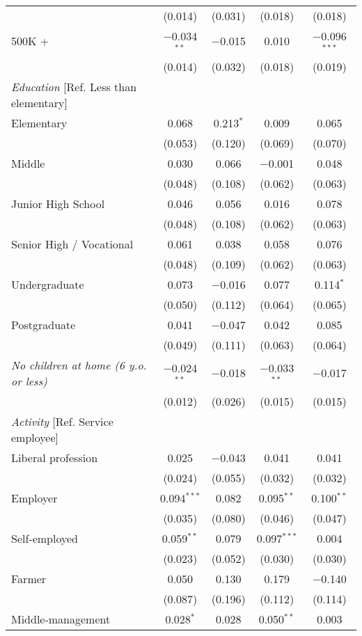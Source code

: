 \documentclass[12pt,a4paper]{article}
\begin{document}
\begin{scriptsize}
\begin{longtable}{@{\extracolsep{5pt}}lcccc}
  & (0.014) & (0.031) & (0.018) & (0.018) \\ 
500K +  & $-$0.034$^{**}$ & $-$0.015 & 0.010 & $-$0.096$^{***}$ \\ 
  & (0.014) & (0.032) & (0.018) & (0.019) \\ 
{\it Education} [Ref. Less than elementary]\\
Elementary & 0.068 & 0.213$^{*}$ & 0.009 & 0.065 \\ 
  & (0.053) & (0.120) & (0.069) & (0.070) \\ 
Middle & 0.030 & 0.066 & $-$0.001 & 0.048 \\ 
  & (0.048) & (0.108) & (0.062) & (0.063) \\ 
Junior High School & 0.046 & 0.056 & 0.016 & 0.078 \\ 
  & (0.048) & (0.108) & (0.062) & (0.063) \\ 
Senior High / Vocational & 0.061 & 0.038 & 0.058 & 0.076 \\ 
  & (0.048) & (0.109) & (0.062) & (0.063) \\ 
Undergraduate & 0.073 & $-$0.016 & 0.077 & 0.114$^{*}$ \\ 
  & (0.050) & (0.112) & (0.064) & (0.065) \\ 
Postgraduate & 0.041 & $-$0.047 & 0.042 & 0.085 \\ 
  & (0.049) & (0.111) & (0.063) & (0.064) \\ 
{\it No children at home (6 y.o. or less)} & $-$0.024$^{**}$ & $-$0.018 & $-$0.033$^{**}$ & $-$0.017 \\ 
  & (0.012) & (0.026) & (0.015) & (0.015) \\ 
{\it Activity} [Ref. Service employee]\\
Liberal profession & 0.025 & $-$0.043 & 0.041 & 0.041 \\ 
  & (0.024) & (0.055) & (0.032) & (0.032) \\ 
Employer & 0.094$^{***}$ & 0.082 & 0.095$^{**}$ & 0.100$^{**}$ \\ 
  & (0.035) & (0.080) & (0.046) & (0.047) \\ 
Self-employed & 0.059$^{**}$ & 0.079 & 0.097$^{***}$ & 0.004 \\ 
  & (0.023) & (0.052) & (0.030) & (0.030) \\ 
Farmer & 0.050 & 0.130 & 0.179 & $-$0.140 \\ 
  & (0.087) & (0.196) & (0.112) & (0.114) \\ 
Middle-management & 0.028$^{*}$ & 0.028 & 0.050$^{**}$ & 0.003 \\ 

\end{longtable}
\end{scriptsize}
\end{document}
